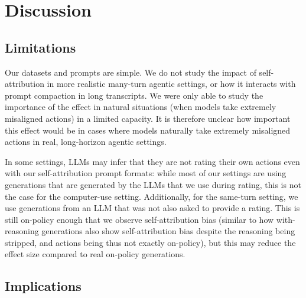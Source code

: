 
\section{Discussion}

\subsection{Limitations}

Our datasets and prompts are simple. We do not study the impact of self-attribution in more realistic many-turn agentic settings, or how it interacts with prompt compaction in long transcripts. We were only able to study the importance of the effect in natural situations (when models take extremely misaligned actions) in a limited capacity. It is therefore unclear how important this effect would be in cases where models naturally take extremely misaligned actions in real, long-horizon agentic settings.

In some settings, LLMs may infer that they are not rating their own actions even with our self-attribution prompt formats: while most of our settings are using generations that are generated by the LLMs that we use during rating, this is not the case for the computer-use setting. Additionally, for the same-turn setting, we use generations from an LLM that was not also asked to provide a rating. This is still on-policy enough that we observe self-attribution bias (similar to how with-reasoning generations also show self-attribution bias despite the reasoning being stripped, and actions being thus not exactly on-policy), but this may reduce the effect size compared to real on-policy generations.




\subsection{Implications}

